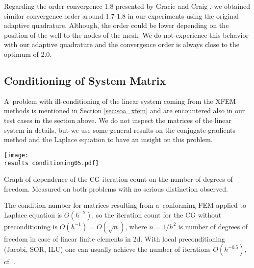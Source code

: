 Regarding the order convergence 1.8 presented by Gracie and Craig \cite{gracie_modelling_2010}, we obtained similar convergence order 
around 1.7-1.8 in our experiments using the original adaptive quadrature. Although, the order could be lower 
depending on the position of the well to the nodes of the mesh. We do not experience this behavior with our adaptive
quadrature and the convergence order is always close to the optimum of 2.0.




\subsection{Conditioning of System Matrix} \label{sec:res_conditioning}
A~problem with ill-conditioning of the linear system coming from the XFEM methods is mentioned in Section \ref{sec:soa_xfem}
and are encountered also in our test cases in the section above. We do not inspect the matrices of the linear system in details, 
but we use some general results on the conjugate gradients method and the Laplace equation to have an insight on this problem.

\begin{graph}[!htb]
  \centering    
    \texttt{[image: \\results conditioning05.pdf]}
  \caption[CG iterations count in Test case 3.]{Graph of dependence of the CG iteration count on the 
  number of degrees of freedom. Measured on both problems with no serious distinction observed.}
  \label{graph:conditioning05}
\end{graph}
%

The condition number for matrices resulting from a~conforming FEM applied to Laplace equation is $O(h^{-2})$, so the iteration count 
for the CG without preconditioning is $O(h^{-1})=O(\sqrt{n})$, where $n=1/h^2$ is number of degrees of freedom in case of linear finite elements in 2d. 
With local preconditioning (Jacobi, SOR, ILU) one can usually achieve the number of iterations $O(h^{-0.5})$, cf. \cite{ern_evaluation_2006}.


